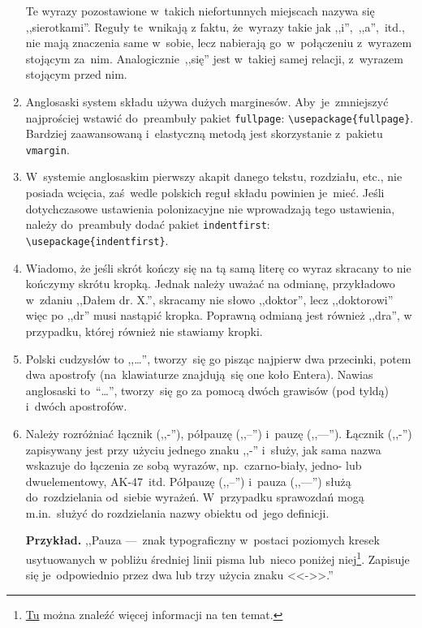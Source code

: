 \documentclass[a4paper,11pt]{article}
\newcommand{\tbs}{\textbackslash}  %
\begin{document}
\begin{enumerate}
  Te wyrazy pozostawione w~takich niefortunnych miejscach nazywa się
  ,,sierotkami''. Reguły te~wnikają z faktu, że~wyrazy takie jak
  ,,i'',~,,a'',~itd., nie mają znaczenia same w~sobie, lecz nabierają
  go~w~połączeniu z~wyrazem stojącym za~nim. Analogicznie~,,się'' jest
  w~takiej samej relacji, z~wyrazem stojącym przed nim.
\item Anglosaski system składu używa dużych marginesów.
  Aby~je~zmniejszyć najprościej wstawić do~preambuły pakiet
  \texttt{fullpage}: \texttt{\tbs usepackage\{fullpage\}}. Bardziej
  zaawansowaną i~elastyczną metodą jest skorzystanie z~pakietu
  \texttt{vmargin}.
\item W~systemie anglosaskim pierwszy akapit danego tekstu, rozdziału,
  etc., nie posiada wcięcia, zaś~wedle polskich reguł składu powinien
  je~mieć. Jeśli dotychczasowe ustawienia polonizacyjne nie
  wprowadzają tego ustawienia, należy do~preambuły dodać pakiet
  \texttt{indentfirst}: \texttt{\tbs usepackage\{indentfirst\}}.
\item Wiadomo, że jeśli skrót kończy się na tą samą literę co wyraz
  skracany to nie kończymy skrótu kropką. Jednak należy uważać na
  odmianę, przykładowo w~zdaniu ,,Dałem dr. X.'', skracamy nie słowo
  ,,doktor'', lecz ,,doktorowi'' więc po ,,dr'' musi nastąpić kropka.
  Poprawną odmianą jest również ,,dra'', w przypadku, której również
  nie stawiamy kropki.
\item Polski cudzysłów to ,,\ldots'', tworzy~się go pisząc najpierw
  dwa przecinki, potem dwa apostrofy (na~klawiaturze znajdują~się one
  koło Entera). Nawias anglosaski to~``\ldots'', tworzy~się go za
  pomocą dwóch grawisów (pod tyldą) i~dwóch apostrofów.
\item Należy rozróżniać łącznik (,,-''), półpauzę (,,--'') i~pauzę
  (,,---''). Łącznik (,,-'') zapisywany jest przy użyciu jednego znaku
  ,,-'' i~służy, jak sama nazwa wskazuje do łączenia ze sobą wyrazów,
  np.~czarno-biały, jedno- lub dwuelementowy, AK-47~itd. Półpauzę
  (,,--'') i~pauza (,,---'') służą do~rozdzielania od~siebie wyrażeń.
  W~przypadku sprawozdań mogą m.in.~służyć do rozdzielania nazwy
  obiektu od~jego definicji.

  \textbf{Przykład.} ,,Pauza ---~znak typograficzny w~postaci
  poziomych kresek usytuowanych w pobliżu średniej linii pisma
  lub~nieco poniżej
  niej\footnote{\href{https://pl.wikipedia.org/wiki/Pauza_(znak_typograficzny)}{Tu}
    można znaleźć więcej informacji na ten temat.}. Zapisuje się
  je~odpowiednio przez dwa lub trzy użycia znaku <<->>.''
\end{enumerate}
\end{document}
